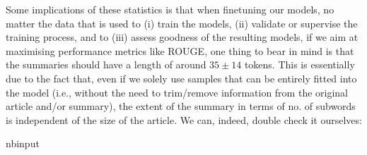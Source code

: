 \documentclass[letterpaper,10pt,english]{sphinxmanual}
\begin{document}
\sphinxAtStartPar
Some implications of these statistics is that when fine\sphinxhyphen{}tuning our models, no matter the data that is used to (i) train the models, (ii) validate or supervise the training process, and to (iii) assess goodness of the resulting models, if we aim at maximising performance metrics like ROUGE, one thing to bear in mind is that the summaries should have a length of around \(35\pm14\) tokens. This is essentially due to the fact that, even if we solely use samples that can be entirely fitted into
the model (i.e., without the need to trim/remove information from the original article and/or summary), the extent of the summary in terms of no. of subwords is independent of the size of the article. We can, indeed, double check it ourselves:

\begin{sphinxuseclass}{nbinput}
{
\begin{sphinxVerbatim}[commandchars=\\\{\}]
\llap{\color{nbsphinxin}[90]:\,\hspace{\fboxrule}\hspace{\fboxsep}}\PYG{p}{[}  \PYG{p}{]}
\end{sphinxVerbatim}
}

\end{sphinxuseclass}
\end{document}
